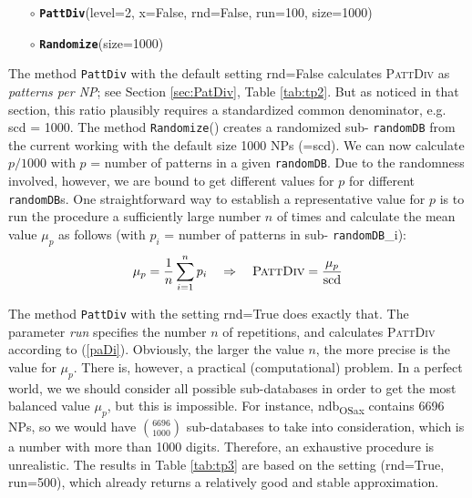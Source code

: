 \documentclass[output=paper,colorlinks,citecolor=brown,draft]{langscibook}
\begin{document}
\begin{enumerate} 

    \item[$\circ$] \textbf{\texttt{PattDiv}}(level=2, x=False, rnd=False, run=100, size=1000) 
    \item[$\circ$] \textbf{\texttt{Randomize}}(size=1000) 
    
\end{enumerate}

\noindent The method \texttt{PattDiv} with the default setting rnd=False calculates \textsc{PattDiv} as \textit{patterns per NP}; see Section \ref{sec:PatDiv}, Table \ref{tab:tp2}. But as noticed in that section, this ratio plausibly requires a standardized common denominator, e.g. scd = 1000.   The method \texttt{Randomize}() creates a randomized sub- \texttt{randomDB} from the current working  with the default size 1000 NPs (=scd). We can now  calculate $p/1000$ with $p$ = number  of patterns in a given \texttt{randomDB}.  
Due to the randomness involved, however, we are bound to get different values for $p$ for different \texttt{randomDB}s. One straightforward way to establish a representative value for $p$ is to run the procedure a sufficiently large number $n$ of times and calculate the  mean  value $\mu_p$ as follows (with  $p_i$ = number of patterns in sub- \texttt{randomDB}\_i): 
\begin{equation}\label{paDi}
\mu_p = \dfrac{1}{n}   \sum\limits_{i=1}^n p_i \quad \Rightarrow \quad \textsc{PattDiv} =  \dfrac{\mu_p}{\text{scd}}
\end{equation} 

The method \texttt{PattDiv} with the setting rnd=True does exactly that. The parameter \textit{run} specifies the number $n$ of repetitions, and calculates \textsc{PattDiv} according to (\ref{paDi}).  Obviously, the larger the value $n$, the more precise is the value for $\mu_p$.  There is, however, a practical (computational) problem. In a perfect world, we we should consider all possible sub-databases in order to get the most balanced value $\mu_p$, but this is impossible. For instance, ndb\textsubscript{OSax} contains 6696 NPs, so we would have ${6696}\choose{1000}$  sub-databases to take into consideration, which is a number with more than 1000 digits. Therefore, an exhaustive procedure is unrealistic. The results in Table \ref{tab:tp3} are based on the setting (rnd=True, run=500), which already returns a relatively good and stable approximation. 
\end{document}

